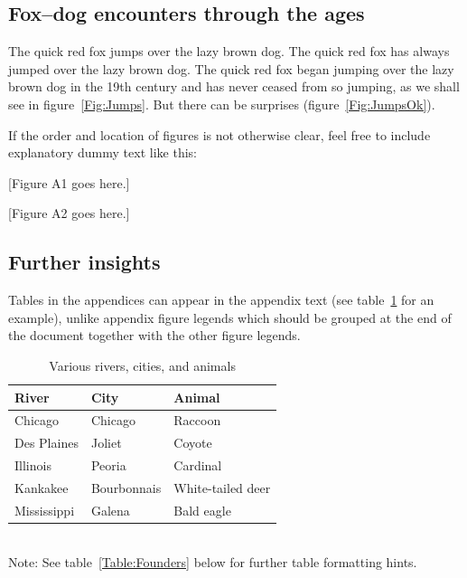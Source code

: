 \documentclass[11pt]{article}
\begin{document}
\renewcommand{\theequation}{A\arabic{equation}}
\renewcommand{\thetable}{A\arabic{table}}
\setcounter{equation}{0}  %
\setcounter{figure}{0}
\setcounter{table}{0}

\subsection*{Fox--dog encounters through the ages}

The quick red fox jumps over the lazy brown dog. The quick red fox has always jumped over the lazy brown dog. The quick red fox began jumping over the lazy brown dog in the 19th century and has never ceased from so jumping, as we shall see in figure~\ref{Fig:Jumps}. But there can be surprises (figure~\ref{Fig:JumpsOk}).

If the order and location of figures is not otherwise clear, feel free to include explanatory dummy text like this:

[Figure A1 goes here.]

[Figure A2 goes here.]

\subsection*{Further insights}

Tables in the appendices can appear in the appendix text (see table~\ref{Table:Rivers} for an example), unlike appendix figure legends which should be grouped at the end of the document together with the other figure legends.

\begin{table}[h]
\caption{Various rivers, cities, and animals}
\label{Table:Rivers}
\centering
\begin{tabular}{lll}\hline
River        & City        & Animal            \\ \hline
Chicago      & Chicago     & Raccoon           \\
Des Plaines  & Joliet      & Coyote            \\
Illinois     & Peoria      & Cardinal          \\
Kankakee     & Bourbonnais & White-tailed deer \\
Mississippi  & Galena      & Bald eagle        \\ \hline
\end{tabular}
\bigskip{}
\\
{\footnotesize Note: See table~\ref{Table:Founders} below for further table formatting hints.}
\end{table}
\end{document}
